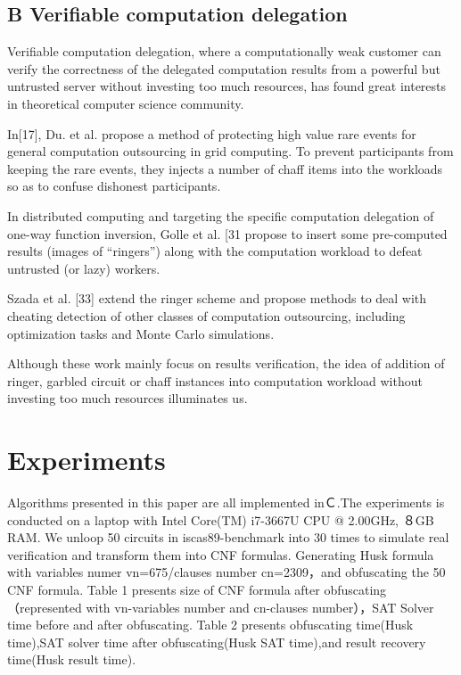 \documentclass[runningheads,a4paper]{llncs}
\begin{document}
\subsection{B Verifiable computation delegation}

Verifiable computation delegation, where a computationally weak customer can verify the correctness of the delegated computation results from a powerful but untrusted server without investing too much resources, has found great interests in theoretical computer science community.

In[17], Du. et al. propose a method of protecting high value rare events for general computation outsourcing in grid computing. To prevent participants from keeping the rare events, they injects a number of chaff items into the workloads so as to confuse dishonest participants.

In distributed computing and targeting the specific computation delegation of one-way function inversion, Golle et al. [31 propose to insert some pre-computed results (images of “ringers”) along with the computation workload to defeat untrusted (or lazy) workers. 

Szada et al. [33] extend the ringer scheme and propose methods to deal with cheating detection of other classes of computation outsourcing, including optimization tasks and Monte Carlo simulations.

Although these work mainly focus on results verification, the idea of addition of ringer, garbled circuit or chaff instances into computation workload without investing too much resources illuminates us.
\section{Experiments} 

Algorithms presented in this paper are all implemented inＣ.The experiments is conducted on a laptop with Intel Core(TM) i7-3667U CPU @ 2.00GHz, ８GB RAM. We unloop 50 circuits in iscas89-benchmark into 30 times to simulate real verification and transform them into CNF formulas. Generating Husk formula with variables numer vn=675/clauses number cn=2309，and obfuscating the 50 CNF formula. Table 1 presents size of CNF formula after obfuscating（represented with vn-variables number and cn-clauses number），SAT Solver time before and after obfuscating. Table 2 presents obfuscating time(Husk time),SAT solver time after obfuscating(Husk SAT time),and result recovery time(Husk result time).
\end{document}
